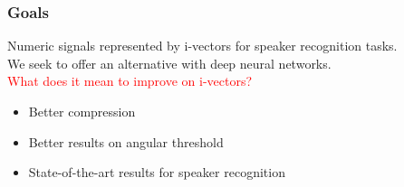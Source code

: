 \documentclass[11pt,english]{beamer}
\begin{document}
\begin{frame}
  \frametitle{Goals }
Numeric signals represented by i-vectors for speaker recognition
tasks.\\ We seek to offer an alternative with deep neural networks.\\
  \textcolor{red}{What does it mean to improve on i-vectors?}
  \begin{itemize}
\setlength\itemsep{1em}
  \item Better compression
  \item Better results on angular threshold
  \item State-of-the-art results for speaker recognition
  \end{itemize}
\end{frame}
\end{document}
